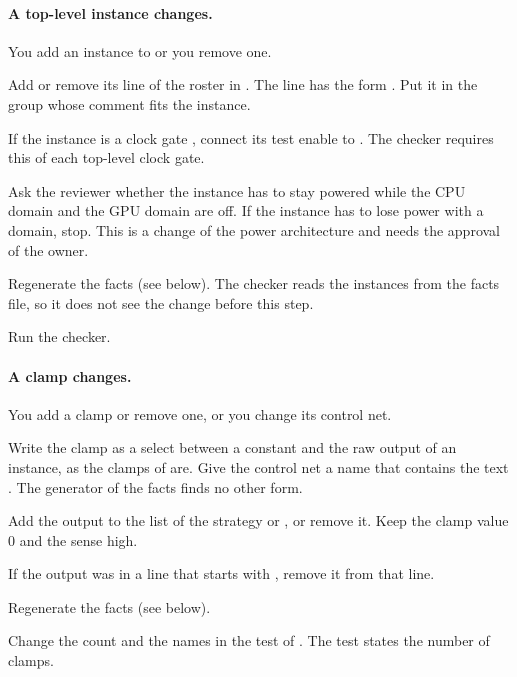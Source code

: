 \paragraph{A top-level instance changes.} You add an instance to  or you remove one.
\begin{procedure}
  \item Add or remove its line of the roster in . The line has the form . Put it in the group whose comment fits the instance.
  \item If the instance is a clock gate , connect its test enable to . The checker requires this of each top-level clock gate.
  \item Ask the reviewer whether the instance has to stay powered while the CPU domain and the GPU domain are off. If the instance has to lose power with a domain, stop. This is a change of the power architecture and needs the approval of the owner.
  \item Regenerate the facts (see below). The checker reads the instances from the facts file, so it does not see the change before this step.
  \item Run the checker.
\end{procedure}

\paragraph{A clamp changes.} You add a clamp or remove one, or you change its control net.
\begin{procedure}
  \item Write the clamp as a select between a constant and the raw output of an instance, as the clamps of  are. Give the control net a name that contains the text . The generator of the facts finds no other form.
  \item Add the output to the  list of the strategy  or , or remove it. Keep the clamp value 0 and the sense high.
  \item If the output was in a line that starts with , remove it from that line.
  \item Regenerate the facts (see below).
  \item Change the count and the names in the test  of . The test states the number of clamps.
\end{procedure}

